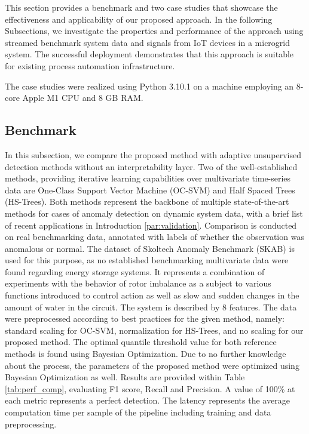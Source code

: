 This section provides a benchmark and two case studies that showcase the effectiveness and applicability of our proposed approach. In the following Subsections, we investigate the properties and performance of the approach using streamed benchmark system data and signals from IoT devices in a microgrid system. The successful deployment demonstrates that this approach is suitable for existing process automation infrastructure.

The case studies were realized using Python 3.10.1 on a machine employing an 8-core Apple M1 CPU and 8 GB RAM.

\subsection{Benchmark}\label{AA:Benchmark}
In this subsection, we compare the proposed method with adaptive unsupervised detection methods without an interpretability layer. Two of the well-established methods, providing iterative learning capabilities over multivariate time-series data are One-Class Support Vector Machine (OC-SVM) and Half Spaced Trees (HS-Trees). Both methods represent the backbone of multiple state-of-the-art methods for cases of anomaly detection on dynamic system data, with a brief list of recent applications in Introduction \ref{par:validation}. Comparison is conducted on real benchmarking data, annotated with labels of whether the observation was anomalous or normal. The dataset of Skoltech Anomaly Benchmark (SKAB) \cite{skab2020} is used for this purpose, as no established benchmarking multivariate data were found regarding energy storage systems. It represents a combination of experiments with the behavior of rotor imbalance as a subject to various functions introduced to control action as well as slow and sudden changes in the amount of water in the circuit. The system is described by 8 features. The data were preprocessed according to best practices for the given method, namely: standard scaling for OC-SVM, normalization for HS-Trees, and no scaling for our proposed method. The optimal quantile threshold value for both reference methods is found using Bayesian Optimization. Due to no further knowledge about the process, the parameters of the proposed method were optimized using Bayesian Optimization as well. Results are provided within Table \ref{tab:perf_comp}, evaluating F1 score, Recall and Precision. A value of 100\% at each metric represents a perfect detection. The latency represents the average computation time per sample of the pipeline including training and data preprocessing.

